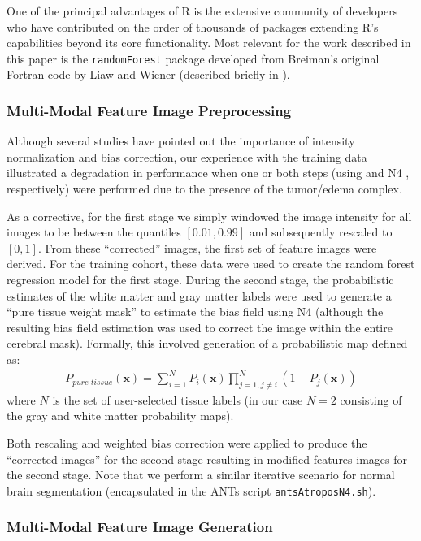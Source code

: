 \documentclass[final,5p,times,twocolumn]{elsarticle}
\begin{document}
One of the principal advantages of R is the extensive community of
developers  who have contributed on the order of thousands of packages 
extending R's capabilities beyond its core functionality.
Most relevant for the work described in this paper
is the \verb#randomForest# package developed from Breiman's original
Fortran code by Liaw and Wiener (described briefly in \cite{liaw2002}).


\subsubsection{Multi-Modal Feature Image Preprocessing}

Although several studies have pointed out the importance of
intensity normalization and bias correction, our experience 
with the training data illustrated a degradation in performance
when one or both steps (using \cite{nyul2000} and N4 \cite{tustison2010},
respectively) were performed due to the presence of the tumor/edema complex. 
 
As a corrective, for the first stage we simply windowed the image intensity
for all images to be between the quantiles $[0.01,0.99]$ and
subsequently rescaled to $[0,1]$.  From these ``corrected'' images,
the first set of feature images were derived.  For the training cohort, these
data were used to create the random forest regression model for the first
stage.  During the second stage, the probabilistic estimates
of the white matter and gray matter labels were used to generate a
``pure tissue weight mask'' to estimate the bias field 
using N4 (although the resulting bias field estimation was used
to correct the image within the entire cerebral mask).  Formally, this 
involved generation of a probabilistic map defined as:
\begin{align}
  P_{pure\,\,tissue}(\mathbf{x}) = \sum_{i=1}^N P_i(\mathbf{x}) \prod_{j=1, j \neq i}^N \left( 1 - P_j(\mathbf{x}) \right)
\end{align}
where $N$ is the set of user-selected tissue labels (in our
case $N=2$ consisting of the gray and white matter probability
maps).

Both rescaling and weighted bias correction were applied to produce
the ``corrected images'' for the second stage resulting in
modified features images for the second stage.  Note that we
perform a similar iterative scenario for normal brain 
segmentation \cite{avants2011} (encapsulated in the ANTs script 
\verb#antsAtroposN4.sh#).

\subsubsection{Multi-Modal Feature Image Generation}
\end{document}
